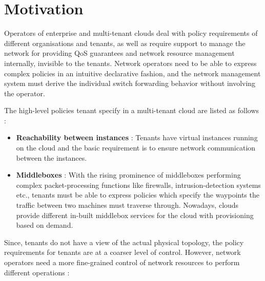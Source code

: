 \documentclass[]{sig}
\begin{document}
\section{Motivation}
Operators of enterprise and multi-tenant clouds deal with policy requirements of different organisations and tenants, as well as require support to manage the network for providing QoS guarantees and network resource management internally, invisible to the tenants. Network operators need to be able to express complex policies in an intuitive declarative fashion, and the network management system must derive the individual switch forwarding behavior without involving the operator. 

The high-level policies tenant specify in a multi-tenant cloud are listed as follows : 
\begin{itemize}
	\item \textbf{Reachability between instances} : Tenants have virtual instances running on the cloud and the basic requirement is to ensure network communication between the instances. 
	\item \textbf{Middleboxes} : With the rising prominence of middleboxes performing complex packet-processing functions like firewalls, intrusion-detection systems etc., tenants must be able to express policies which specify the waypoints the traffic between two machines must traverse through. Nowadays, clouds provide different in-built middlebox services for the cloud with provisioning based on demand. 
\end{itemize}
Since, tenants do not have a view of the actual physical topology, the policy requirements for tenants are at a coarser level of control. However, network operators need a more fine-grained control of network resources to perform different operations : 
\end{document}
